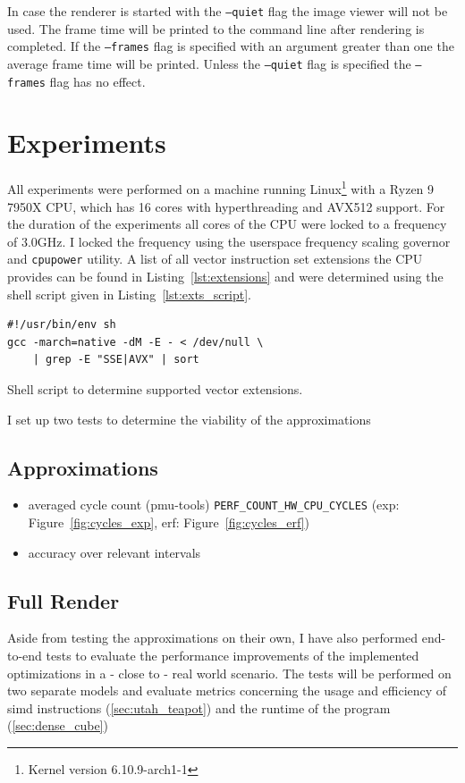 \documentclass[a4paper, 11pt]{memoir}
\begin{document}
    In case the renderer is started with the \texttt{--quiet} flag the image viewer will not be used. The frame
    time will be printed to the command line after rendering is completed. If the \texttt{--frames} flag is
    specified with an argument greater than one the average frame time will be printed. Unless the \texttt{--quiet}
    flag is specified the \texttt{--frames} flag has no effect.

    \chapter{Experiments}
    \label{ch:experiments}
    
    All experiments were performed on a machine running Linux\footnote{Kernel version 6.10.9-arch1-1} with a Ryzen 9 7950X CPU, which has 16 cores with
    hyperthreading and AVX512 support. For the duration of the experiments all cores of the CPU were locked to a
    frequency of $3.0$GHz. I locked the frequency using the userspace frequency scaling governor and \texttt{cpupower}
    utility. A list of all vector instruction set extensions the CPU provides can be found in Listing~\ref{lst:extensions}
    and were determined using the shell script given in Listing~\ref{lst:exts_script}.
    \begin{listing}[H]
        \begin{verbatim}
#!/usr/bin/env sh
gcc -march=native -dM -E - < /dev/null \
    | grep -E "SSE|AVX" | sort
        \end{verbatim}
        \caption{Shell script to determine supported vector extensions.}
        \label{lst:exts_script}
    \end{listing}

    I set up two tests to determine the viability of the approximations

    \section{Approximations}
    \begin{itemize}
        \item averaged cycle count (pmu-tools) \texttt{PERF_COUNT_HW_CPU_CYCLES} (exp: Figure~\ref{fig:cycles_exp}, erf: Figure~\ref{fig:cycles_erf})
        \item accuracy over relevant intervals
    \end{itemize}

    \section{Full Render}
    Aside from testing the approximations on their own, I have also performed end-to-end tests
    to evaluate the performance improvements of the implemented optimizations in a - close to - real world scenario.
    The tests will be performed on two separate models and evaluate metrics concerning the usage and efficiency of
    \gls{simd} instructions (\ref{sec:utah_teapot}) and the runtime of the program (\ref{sec:dense_cube})
\end{document}
